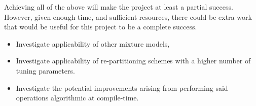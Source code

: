 \documentclass[12pt]{article}
\begin{document}
Achieving all of the above will make the project at least a partial
success. However, given enough time, and sufficient resources, there
could be extra work that would be useful for this project to be a
complete success.

\goodbreak%
\begin{itemize}
\item Investigate applicability of other mixture models,\autocite{Higson2018DynamicNS}
\item Investigate applicability of re-partitioning schemes with a higher
  number of tuning parameters.
\item Investigate the potential improvements arising from performing
  said operations algorithmic at compile-time.
\end{itemize}
\printbibliography%
\end{document}
